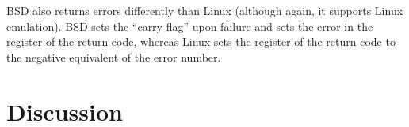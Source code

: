 \documentclass[a4paper, 10pt]{report}
\begin{document}
BSD also returns errors differently than Linux (although again, it supports
Linux emulation). BSD sets the ``carry flag'' upon failure and sets the error
in the register of the return code, whereas Linux sets the register of the
return code to the negative equivalent of the error number\cite{bsdasm}.






% 


\chapter{Discussion}




%
\end{document}
